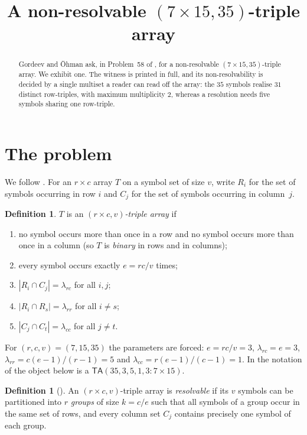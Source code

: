 \documentclass[11pt]{amsart}
\title[A non-resolvable $(7\times15,35)$-triple array]
{A non-resolvable $(7\times 15,35)$-triple array}
\date{}
\theoremstyle{definition}
\newtheorem{definition}[theorem]{Definition}
\newcommand{\TA}{\mathsf{TA}}
\begin{document}
\begin{abstract}
Gordeev and \"Ohman ask, in Problem~58 of \cite{GO}, for a non-resolvable
$(7\times 15,35)$-triple array. We exhibit one. The witness is printed in full, and its
non-resolvability is decided by a single multiset a reader can read off the array: the
$35$ symbols realise $31$ distinct row-triples, with maximum multiplicity $2$, whereas a
resolution needs five symbols sharing one row-triple.
\end{abstract}

\maketitle

\section{The problem}

We follow \cite[Definition~6]{GO}. For an $r\times c$ array $T$ on a symbol set of size
$v$, write $R_i$ for the set of symbols occurring in row $i$ and $C_j$ for the set of
symbols occurring in column~$j$.

\begin{definition}\label{def:ta}
$T$ is an \emph{$(r\times c,v)$-triple array} if
\begin{enumerate}
\item[(T1)] no symbol occurs more than once in a row and no symbol occurs more than once in
a column (so $T$ is \emph{binary} in rows and in columns);
\item[(T2)] every symbol occurs exactly $e=rc/v$ times;
\item[(T3)] $|R_i\cap C_j|=\lambda_{rc}$ for all $i,j$;
\item[(T4)] $|R_i\cap R_s|=\lambda_{rr}$ for all $i\ne s$;
\item[(T5)] $|C_j\cap C_t|=\lambda_{cc}$ for all $j\ne t$.
\end{enumerate}
\end{definition}

For $(r,c,v)=(7,15,35)$ the parameters are forced:
$e=rc/v=3$, $\lambda_{rc}=e=3$, $\lambda_{rr}=c(e-1)/(r-1)=5$ and
$\lambda_{cc}=r(e-1)/(c-1)=1$. In the notation of \cite{GO} the object below is a
$\TA(35,3,5,1,3:7\times 15)$.

\begin{definition}[{\cite[Definition~21]{GO}}]\label{def:res}
An $(r\times c,v)$-triple array is \emph{resolvable} if its $v$ symbols can be partitioned
into $r$ \emph{groups} of size $k=c/e$ such that all symbols of a group occur in the same
set of rows, and every column set $C_j$ contains precisely one symbol of each group.
\end{definition}
\end{document}
